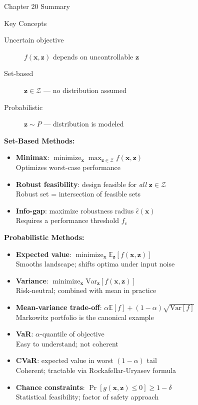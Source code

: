 \documentclass[aspectratio=169,10pt]{beamer}
\newcommand{\x}{\mathbf{x}}
\newcommand{\z}{\mathbf{z}}
\newcommand{\E}{\mathbb{E}}
\newcommand{\Var}{\mathrm{Var}}
\newcommand{\Z}{\mathcal{Z}}
\newcommand{\eps}{\epsilon}
\DeclareMathOperator*{\minimize}{minimize}
\begin{document}
\begin{frame}[allowframebreaks]{Chapter 20 Summary}
  \begin{block}{Key Concepts}
    \begin{description}
      \item[Uncertain objective] $f(\x,\z)$ depends on uncontrollable $\z$
      \item[Set-based] $\z \in \Z$ — no distribution assumed
      \item[Probabilistic] $\z \sim P$ — distribution is modeled
    \end{description}
  \end{block}

  \textbf{Set-Based Methods:}
  \begin{itemize}
    \item \textbf{Minimax}: $\minimize_\x \max_{\z\in\Z} f(\x,\z)$\\
          Optimizes worst-case performance
    \item \textbf{Robust feasibility}: design feasible for \emph{all} $\z\in\Z$\\
          Robust set = intersection of feasible sets
    \item \textbf{Info-gap}: maximize robustness radius $\hat\eps(\x)$\\
          Requires a performance threshold $f_c$
  \end{itemize}

  \framebreak

  \textbf{Probabilistic Methods:}
  \begin{itemize}
    \item \textbf{Expected value}: $\minimize_\x \E_\z[f(\x,\z)]$\\
          Smooths landscape; shifts optima under input noise
    \item \textbf{Variance}: $\minimize_\x \Var_\z[f(\x,\z)]$\\
          Risk-neutral; combined with mean in practice
    \item \textbf{Mean-variance trade-off}: $\alpha\E[f] + (1-\alpha)\sqrt{\Var[f]}$\\
          Markowitz portfolio is the canonical example
    \item \textbf{VaR}: $\alpha$-quantile of objective\\
          Easy to understand; not coherent
    \item \textbf{CVaR}: expected value in worst $(1-\alpha)$ tail\\
          Coherent; tractable via Rockafellar-Uryasev formula
    \item \textbf{Chance constraints}: $\Pr[g(\x,\z)\le 0] \ge 1-\delta$\\
          Statistical feasibility; factor of safety approach
  \end{itemize}
\end{frame}
\end{document}
